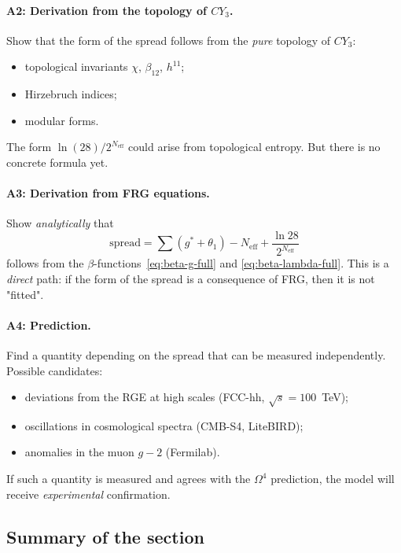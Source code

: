 \documentclass[11pt,a4paper]{article}
\newcommand{\CY}{\ensuremath{CY_3}}
\newcommand{\Om}{\ensuremath{\Omega^4}}
\theoremstyle{definition}
\begin{document}
\paragraph{A2: Derivation from the topology of \texorpdfstring{$\CY$}{}.}
Show that the form of the spread follows from the \emph{pure}
topology of $\CY$:
\begin{itemize}
    \item topological invariants $\chi$, $\beta_{12}$, $h^{11}$;
    \item Hirzebruch indices;
    \item modular forms.
\end{itemize}
The form $\ln(28)/2^{N_{\text{eff}}}$ could arise
from topological entropy. But there is no concrete formula yet.

\paragraph{A3: Derivation from FRG equations.}
Show \emph{analytically} that
\begin{equation}
    \text{spread} = \sum(g^* + \theta_1) - N_{\text{eff}}
    + \frac{\ln 28}{2^{N_{\text{eff}}}}
\end{equation}
follows from the $\beta$-functions~\eqref{eq:beta-g-full} and
\eqref{eq:beta-lambda-full}. This is a \emph{direct} path: if the
form of the spread is a consequence of FRG, then it is not "fitted".

\paragraph{A4: Prediction.}
Find a quantity depending on the spread that can be
measured independently. Possible candidates:
\begin{itemize}
    \item deviations from the RGE at high scales
          (FCC-hh, $\sqrt{s} = 100$~TeV);
    \item oscillations in cosmological spectra
          (CMB-S4, LiteBIRD);
    \item anomalies in the muon $g-2$ (Fermilab).
\end{itemize}
If such a quantity is measured and agrees with the
$\Om$ prediction, the model will receive \emph{experimental}
confirmation.

\subsection{Summary of the section}
\label{subsec:open-summary}
\end{document}
